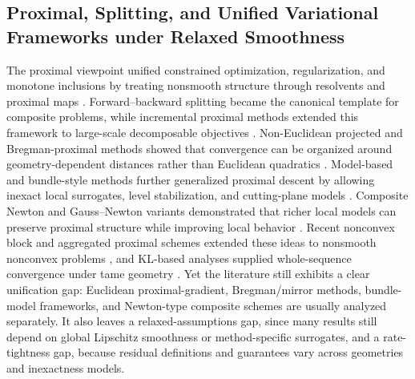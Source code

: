 \documentclass[11pt]{article}
\begin{document}
\subsection{Proximal, Splitting, and Unified Variational Frameworks under Relaxed Smoothness}
The proximal viewpoint unified constrained optimization, regularization, and monotone inclusions by treating nonsmooth structure through resolvents and proximal maps \citep{unknown2018monotone}. Forward--backward splitting became the canonical template for composite problems, while incremental proximal methods extended this framework to large-scale decomposable objectives \citep{Bertsekas_2011}. Non-Euclidean projected and Bregman-proximal methods showed that convergence can be organized around geometry-dependent distances rather than Euclidean quadratics \citep{Auslender_2007, Eckstein_1998, unknown1998bundle}. Model-based and bundle-style methods further generalized proximal descent by allowing inexact local surrogates, level stabilization, and cutting-plane models \citep{unknown2019nonsmooth, Kiwiel_1995, unknown2019multiproximal, Chen_1994}. Composite Newton and Gauss--Newton variants demonstrated that richer local models can preserve proximal structure while improving local behavior \citep{unknown2022globally, Qi_1997, unknown2001convergence, Miller_2005, Billups_2000}. Recent nonconvex block and aggregated proximal schemes extended these ideas to nonsmooth nonconvex problems \citep{unknown2021block}, and KL-based analyses supplied whole-sequence convergence under tame geometry \citep{Attouch_2007}. Yet the literature still exhibits a clear unification gap: Euclidean proximal-gradient, Bregman/mirror methods, bundle-model frameworks, and Newton-type composite schemes are usually analyzed separately. It also leaves a relaxed-assumptions gap, since many results still depend on global Lipschitz smoothness or method-specific surrogates, and a rate-tightness gap, because residual definitions and guarantees vary across geometries and inexactness models.
\end{document}
